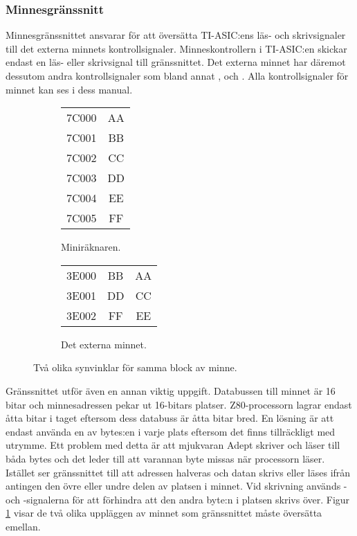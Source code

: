 \documentclass[main.tex]{subfiles}
\begin{document}
\subsubsection{Minnesgränssnitt}
Minnesgränssnittet ansvarar för att översätta TI-ASIC:ens läs- och
skrivsignaler till det externa minnets kontrollsignaler. Minneskontrollern i
TI-ASIC:en skickar endast en läs- eller skrivsignal till gränssnittet. Det
externa minnet har däremot dessutom andra kontrollsignaler som bland annat
,  och . Alla
kontrollsignaler för minnet kan ses i dess manual.\cite{m45}

\begin{figure}[b]
    \begin{subfigure}{0.5\textwidth}
        \centering
        \ttfamily
        \begin{tabular}{r|c|}
            \cline{2-2}
            7C000 & AA \\ \cline{2-2}
            7C001 & BB \\ \cline{2-2}
            7C002 & CC \\ \cline{2-2}
            7C003 & DD \\ \cline{2-2}
            7C004 & EE \\ \cline{2-2}
            7C005 & FF \\ \cline{2-2}
        \end{tabular}
        \caption{Miniräknaren.}
    \end{subfigure}
    \begin{subfigure}{0.5\textwidth}
        \centering
        \ttfamily
        \begin{tabular}{r|c|c|}
            \cline{2-3}
            3E000 & BB & AA \\ \cline{2-3}
            3E001 & DD & CC \\ \cline{2-3}
            3E002 & FF & EE \\ \cline{2-3}
        \end{tabular}
        \caption{Det externa minnet.}
    \end{subfigure}
    \caption{Två olika synvinklar för samma block av minne.}
    \label{fig:mif}
\end{figure}

Gränssnittet utför även en annan viktig uppgift. Databussen till minnet är 16
bitar och minnesadressen pekar ut 16-bitars platser. Z80-processorn lagrar
endast åtta bitar i taget eftersom dess databuss är åtta bitar bred. En lösning
är att endast använda en av bytes:en i varje plats eftersom det finns
tillräckligt med utrymme. Ett problem med detta är att mjukvaran Adept skriver
och läser till båda bytes och det leder till att varannan byte missas när
processorn läser. Istället ser gränssnittet till att adressen halveras och
datan skrivs eller läses ifrån antingen den övre eller undre delen av platsen i
minnet. Vid skrivning används - och
-signalerna för att förhindra att den andra byte:n i platsen
skrivs över. Figur \ref{fig:mif} visar de två olika uppläggen av minnet som
gränssnittet måste översätta emellan.
\end{document}
